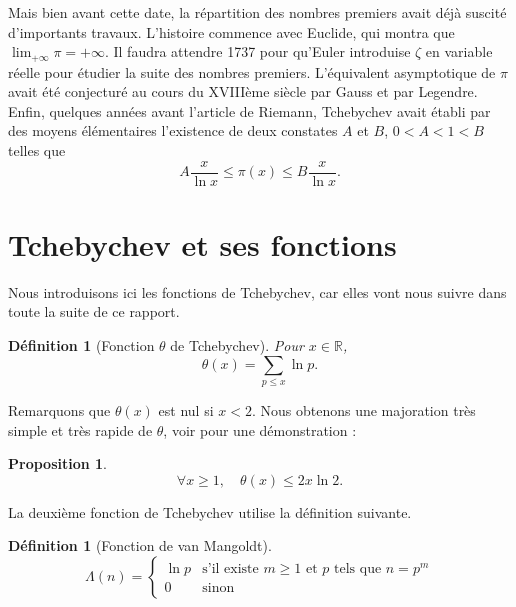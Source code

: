 \documentclass[french]{report}
\newtheorem{definition}[theorem]{Définition}
\newtheorem{proposition}[theorem]{Proposition}
\begin{document}
Mais bien avant cette date, la répartition des nombres premiers avait déjà suscité d'importants travaux. L'histoire commence avec Euclide, qui montra que $\lim_{+\infty}\pi=+\infty$. Il faudra attendre 1737 pour qu'Euler introduise $\zeta$ en variable réelle pour étudier la suite des nombres premiers. L'équivalent asymptotique de $\pi$ avait été conjecturé au cours du XVIIIème siècle par Gauss et par Legendre. Enfin, quelques années avant l'article de Riemann, Tchebychev avait établi par des moyens élémentaires l'existence de deux constates $A$ et $B$, $0<A<1<B$ telles que
\[
  A\frac{x}{\ln x}\leq\pi(x)\leq B\frac{x}{\ln x}.
\]

\section{Tchebychev et ses fonctions}

Nous introduisons ici les fonctions de Tchebychev, car elles vont nous suivre dans toute la suite de ce rapport.

\begin{definition}[Fonction $\theta$ de Tchebychev] Pour $x\in \mathbb{R}$,
  \[ \theta(x) = \sum_{p \le x}\ln p. \]
\end{definition}

Remarquons que $\theta(x)$ est nul si $x<2$. Nous obtenons une majoration très simple et très rapide de $\theta$, voir \cite{hindry} pour une démonstration :

\begin{proposition}\label{prop:theta-majoration}
  \[
    \forall x\geq1,\quad \theta(x)\leq 2x\ln 2.
  \]
\end{proposition}

La deuxième fonction de Tchebychev utilise la définition suivante.

\begin{definition}[Fonction de van Mangoldt]
  \[
    \Lambda(n)=
    \begin{cases}
      \ln p & \text{s'il existe $m\geq1$ et $p$ tels que $n=p^m$} \\
      0 & \text{sinon}
    \end{cases}
  \]
\end{definition}
\end{document}
